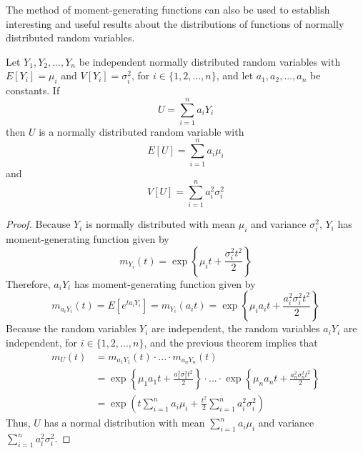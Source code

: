 \documentclass[12pt, a4paper, twoside, openright, titlepage]{book}
\begin{document}
The method of moment-generating functions can also be used to establish interesting and useful results about the distributions of functions of normally distributed random variables.

\begin{thm}{}{}
    Let $Y_1,Y_2,...,Y_n$ be independent normally distributed random variables with $E[Y_i] = \mu_i$ and $V[Y_i] = \sigma_i^2$, for $i \in \{1,2,...,n\}$, and let $a_1,a_2,...,a_n$ be constants. If \begin{equation*}
        U = \sum\limits_{i=1}^na_iY_i
    \end{equation*}
    then $U$ is a normally distributed random variable with \begin{equation*}
        E[U] = \sum\limits_{i=1}^na_i\mu_i
    \end{equation*}
    and \begin{equation*}
        V[U] = \sum\limits_{i=1}^na_i^2\sigma_i^2
    \end{equation*}
\end{thm}
\begin{proof}{}{}
    Because $Y_i$ is normally distributed with mean $\mu_i$ and variance $\sigma_i^2$, $Y_i$ has moment-generating function given by \begin{equation*}
        m_{Y_i}(t) = \exp\left\{\mu_i t + \frac{\sigma_i^2t^2}{2}\right\}
    \end{equation*}
    Therefore, $a_iY_i$ has moment-generating function given by \begin{equation*}
        m_{a_iY_i}(t) = E[e^{ta_iY_i}] = m_{Y_i}(a_it) = \exp\left\{\mu_ia_it + \frac{a_i^2\sigma_i^2t^2}{2}\right\}
    \end{equation*}
    Because the random variables $Y_i$ are independent, the random variables $a_iY_i$ are independent, for $i \in \{1,2,...,n\}$, and the previous theorem implies that \begin{align*}
        m_U(t) &= m_{a_1Y_1}(t)\cdot...\cdot m_{a_nY_n}(t) \\
        &= \exp\left\{\mu_1a_1t + \frac{a_1^2\sigma_1^2t^2}{2}\right\}\cdot...\cdot \exp\left\{\mu_na_nt + \frac{a_n^2\sigma_n^2t^2}{2}\right\} \\
        &= \exp\left(t\sum\limits_{i=1}^na_i\mu_i + \frac{t^2}{2}\sum\limits_{i=1}^na_i^2\sigma_i^2\right)
    \end{align*}
    Thus, $U$ has a normal distribution with mean $\sum\limits_{i=1}^na_i\mu_i$ and variance $\sum\limits_{i=1}^na_i^2\sigma_i^2$.
\end{proof}
\end{document}

